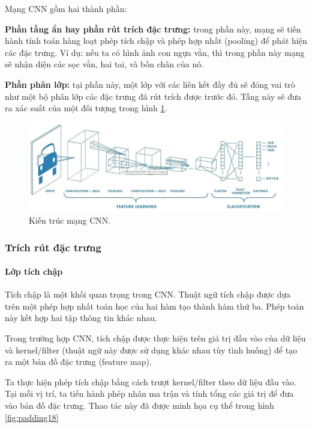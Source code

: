 Mạng CNN gồm hai thành phần:

\indent\indent \textbf{Phần tầng ẩn hay phần rút trích đặc trưng:} trong phần này, mạng sẽ tiến hành tính toán hàng loạt phép tích chập và phép hợp nhất (pooling) để phát hiện các đặc trưng. Ví dụ: nếu ta có hình ảnh con ngựa vằn, thì trong phần này mạng sẽ nhận diện các sọc vằn, hai tai, và bốn chân của nó.

\indent\indent  \textbf{Phần phân lớp:} tại phần này, một lớp với các liên kết đầy đủ sẽ đóng vai trò như một bộ phân lớp các đặc trưng đã rút trích được trước đó. Tầng này sẽ đưa ra xác suất của một đối tượng trong hình \ref{fig:kientruccnn}.
\begin{figure}[H]
	\centering
	\includegraphics[width=1\linewidth]{images/kientruccnn}
	\caption{Kiến trúc mạng CNN.}
	\label{fig:kientruccnn}
\end{figure}

\subsubsection{Trích rút đặc trưng}
\paragraph{Lớp tích chập}
Tích chập là một khối quan trọng trong CNN. Thuật ngữ tích chập được dựa trên một phép hợp nhất toán học của hai hàm tạo thành hàm thứ ba. Phép toán này kết hợp hai tập thông tin khác nhau.

Trong trường hợp CNN, tích chập được thực hiện trên giá trị đầu vào của dữ liệu và kernel/filter (thuật ngữ này được sử dụng khác nhau tùy tình huống) để tạo ra một bản đồ đặc trưng (feature map). 

Ta thực hiện phép tích chập bằng cách trượt kernel/filter theo dữ liệu đầu vào. Tại mỗi vị trí, ta tiến hành phép nhân ma trận và tính tổng các giá trị để đưa vào bản đồ đặc trưng. Thao tác này đã được minh họa cụ thể trong hình \ref{fig:padding18}

